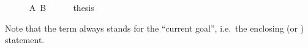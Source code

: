 \begin{isabellebody}
\isanewline
\ \ \ \ \isamarkupfalse%
\ {\isachardoublequote}A{\isachardoublequote}\ {\isachardoublequote}B{\isachardoublequote}\isanewline
\ \ \ \ \isamarkupfalse%
\ {\isacharquery}thesis\ \isamarkupfalse%
\isacommand{{\isachardot}{\isachardot}}\isanewline
\ \ \isamarkupfalse%
\isanewline
\isamarkupfalse%
%
\endisatagproof
{\isafoldproof}%
%
\isadelimproof
%
\endisadelimproof
\isamarkuptrue%
%
\begin{isamarkuptext}%
\noindent Note that the term  always stands for the
``current goal'', i.e.\ the enclosing  (or
) statement.


\end{isamarkuptext}
\end{isabellebody}
